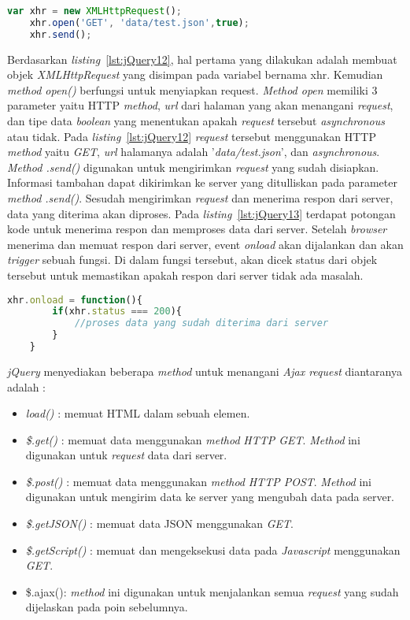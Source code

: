 \begin{lstlisting}[language=Javascript, caption=Membuat \textit{Ajax request} , label={lst:jQuery12}]
	var xhr = new XMLHttpRequest();
	xhr.open('GET', 'data/test.json',true);
	xhr.send();
\end{lstlisting}

Berdasarkan \textit{listing}~\ref{lst:jQuery12}, hal pertama yang dilakukan adalah membuat objek \textit{XMLHttpRequest} yang disimpan pada variabel bernama xhr. Kemudian \textit{method open()} berfungsi untuk menyiapkan request. \textit{Method open} memiliki 3 parameter yaitu HTTP \textit{method}, \textit{url} dari halaman yang akan menangani \textit{request}, dan tipe data \textit{boolean} yang menentukan apakah \textit{request} tersebut \textit{asynchronous} atau tidak. Pada \textit{listing}~\ref{lst:jQuery12} \textit{request} tersebut menggunakan HTTP \textit{method} yaitu \textit{GET}, \textit{url} halamanya adalah '\textit{data/test.json}', dan \textit{asynchronous}. \textit{Method .send()} digunakan untuk mengirimkan \textit{request} yang sudah disiapkan. Informasi tambahan dapat dikirimkan ke server yang ditulliskan pada parameter \textit{method .send()}. Sesudah mengirimkan \textit{request} dan menerima respon dari server, data yang diterima akan diproses. Pada \textit{listing}~\ref{lst:jQuery13} terdapat potongan kode untuk menerima respon dan memproses data dari server. Setelah \textit{browser} menerima dan memuat respon dari server, event \textit{onload} akan dijalankan dan akan \textit{trigger} sebuah fungsi. Di dalam fungsi tersebut, akan dicek status dari objek tersebut untuk memastikan apakah respon dari server tidak ada masalah. 

\begin{lstlisting}[language=Javascript, caption=Memproses respon yang didapat dari server, label={lst:jQuery13}]
	xhr.onload = function(){
		if(xhr.status === 200){
			//proses data yang sudah diterima dari server
		}
	}
\end{lstlisting}

\textit{jQuery} menyediakan beberapa \textit{method} untuk menangani \textit{Ajax request} diantaranya adalah :

\begin{itemize}
	\item \textit{load()} : memuat HTML dalam sebuah elemen.
	\item \textit{\$.get()} : memuat data menggunakan \textit{method} \textit{HTTP GET}. \textit{Method} ini digunakan untuk \textit{request} data dari server.
	\item \textit{\$.post()} : memuat data menggunakan \textit{method} \textit{HTTP POST}. \textit{Method} ini digunakan untuk mengirim data ke server yang mengubah data pada server.
	\item \textit{\$.getJSON()} : memuat data JSON menggunakan \textit{GET}. 
	\item \textit{\$.getScript()} : memuat dan mengeksekusi data pada \textit{Javascript} menggunakan \textit{GET}.
	\item \$.ajax(): \textit{method} ini digunakan untuk menjalankan semua \textit{request} yang sudah dijelaskan pada poin sebelumnya. 
\end{itemize}

